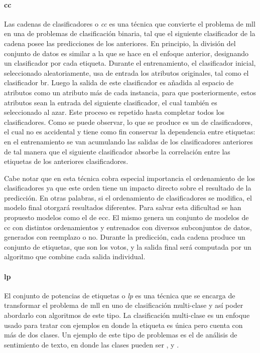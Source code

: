 \paragraph{\acrfull{cc}}

Las cadenas de clasificadores o \textit{\acrlong{cc}}
\cite{read_classifier_2011} es una técnica que convierte el problema de
\acrshort{mll} en una  de problemas de clasificación binaria,
tal que el siguiente clasificador de la cadena posee las predicciones de los
anteriores. En principio, la división del conjunto de datos es similar a la que
se hace en el enfoque anterior, designando un clasificador por cada etiqueta.
Durante el entrenamiento, el clasificador inicial, seleccionado aleatoriamente,
usa de entrada los atributos originales, tal como el clasificador \acrshort{br}.
Luego la salida de este clasificador es añadida al espacio de atributos como un
atributo más de cada instancia, para que posteriormente, estos atributos sean la
entrada del siguiente clasificador, el cual también es seleccionado al azar.
Este proceso es repetido hasta completar todos los clasificadores.  Como se
puede observar, lo que se produce es un  de
clasificadores, el cual no es accidental y tiene como fin conservar la
dependencia entre etiquetas: en el entrenamiento se van acumulando las salidas
de los clasificadores anteriores de tal manera que el siguiente clasificador
absorbe la correlación entre las etiquetas de los anteriores clasificadores. 

Cabe notar que en esta técnica cobra especial importancia el ordenamiento de los
clasificadores ya que este orden tiene un impacto directo sobre el resultado de
la predicción. En otras palabras, si el ordenamiento de clasificadores se
modifica, el modelo final otorgará resultados diferentes. Para salvar esta
dificultad se han propuesto modelos como el de \acrfull{ecc}. El mismo genera un
conjunto de modelos de \acrshort{cc} con distintos ordenamientos y entrenados
con diversos subconjuntos de datos, generados con reemplazo o no. Durante la
predicción, cada cadena produce un conjunto de etiquetas, que son los votos, y
la salida final será computada por un algoritmo que combine cada salida
individual.
 
\paragraph{\acrfull{lp}}

El conjunto de potencias de etiquetas o \textit{\acrlong{lp}}
\cite{tsoumakas_random_2011} es una técnica que se encarga de transformar el
problema de \acrshort{mll} en uno de clasificación multi-clase y así poder
abordarlo con algoritmos de este tipo. La clasificación multi-clase es un
enfoque usado para tratar con ejemplos en donde la etiqueta es única pero cuenta
con más de dos clases. Un ejemplo de este tipo de problemas es el de análisis de
sentimiento de texto, en donde las clases pueden ser ,
 y . 

